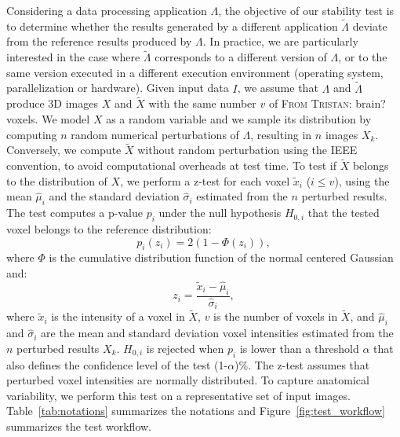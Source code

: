 \documentclass[lettersize,journal]{IEEEtran}
\newcommand{\TG}[1]{\color{blue}\textsc{From Tristan:} #1\color{black}\xspace}
\begin{document}
Considering a data processing application $\Lambda$, the objective of our stability test is to determine whether the results generated by a different application $\tilde \Lambda$ deviate from the reference results produced by $\Lambda$. In practice, we are particularly interested in the case where $\tilde \Lambda$ corresponds to a different version of $\Lambda$, or to the same version executed in a different execution environment (operating system, parallelization or hardware). Given input data $I$, we assume that $\Lambda$ and $\tilde \Lambda$ produce 3D images $X$ and $\tilde X$ with the same number $v$ of \TG{brain?} voxels. We model $X$ as a random variable and we sample its distribution by computing $n$ random numerical perturbations of $\Lambda$, resulting in $n$ images $X_k$. Conversely, we compute $\tilde X$ without random perturbation using the IEEE convention, to avoid computational overheads at test time. To test if $\tilde X$ belongs to the distribution of $X$, we perform a z-test for each voxel $\tilde x_i$ ($i\leq v$), using the mean $\hat \mu_i$ and the standard deviation $\hat \sigma_i$ estimated from the $n$ perturbed results. The test computes a p-value $p_i$ under the null hypothesis $H_{0,i}$ that the tested voxel belongs to the reference distribution:
\begin{equation} \label{eq:pval}
    p_i(z_i) = 2 \left(1-\Phi(z_i)\right),
\end{equation}
where $\Phi$ is the cumulative distribution function of the normal centered
Gaussian and:
\begin{equation*}
    z_i = \frac{\tilde x_i-\hat \mu_i}{\hat \sigma_i},
\end{equation*}
where $\tilde x_i$ is the intensity of a voxel in $\tilde X$, $v$ is the number of voxels in $\tilde X$, and $\hat \mu_i$ and $\hat \sigma_i$ are the mean and standard deviation voxel intensities estimated from the $n$ perturbed results $X_k$. $H_{0,i}$ is rejected when $p_i$ is lower than a threshold $\alpha$ that also defines the confidence level of the test (1-$\alpha$)\%. The z-test assumes that perturbed voxel intensities are normally distributed. To capture anatomical variability, we perform this test on a representative set of input images. Table~\ref{tab:notations} summarizes the notations and Figure~\ref{fig:test_workflow} summarizes the test workflow. 
\end{document}
